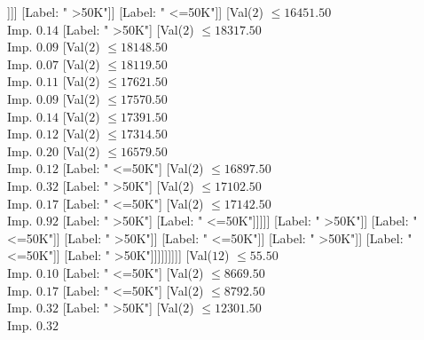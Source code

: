 \documentclass[margin=10pt]{standalone}
\begin{document}
\begin{forest}
																							[Label: " <=50K"]
																							[Val($2$) $ \leq 14367.50$ \\ Imp. $0.81$
																								[Label: " >50K"]
																								[Label: " <=50K"]]]]
																					[Label: " >50K"]]
																				[Label: " <=50K"]]
																			[Val($2$) $ \leq 16451.50$ \\ Imp. $0.14$
																				[Label: " >50K"]
																				[Val($2$) $ \leq 18317.50$ \\ Imp. $0.09$
																					[Val($2$) $ \leq 18148.50$ \\ Imp. $0.07$
																						[Val($2$) $ \leq 18119.50$ \\ Imp. $0.11$
																							[Val($2$) $ \leq 17621.50$ \\ Imp. $0.09$
																								[Val($2$) $ \leq 17570.50$ \\ Imp. $0.14$
																									[Val($2$) $ \leq 17391.50$ \\ Imp. $0.12$
																										[Val($2$) $ \leq 17314.50$ \\ Imp. $0.20$
																											[Val($2$) $ \leq 16579.50$ \\ Imp. $0.12$
																												[Label: " <=50K"]
																												[Val($2$) $ \leq 16897.50$ \\ Imp. $0.32$
																													[Label: " >50K"]
																													[Val($2$) $ \leq 17102.50$ \\ Imp. $0.17$
																														[Label: " <=50K"]
																														[Val($2$) $ \leq 17142.50$ \\ Imp. $0.92$
																															[Label: " >50K"]
																															[Label: " <=50K"]]]]]
																											[Label: " >50K"]]
																										[Label: " <=50K"]]
																									[Label: " >50K"]]
																								[Label: " <=50K"]]
																							[Label: " >50K"]]
																						[Label: " <=50K"]]
																					[Label: " >50K"]]]]]]]]]
													[Val($12$) $ \leq 55.50$ \\ Imp. $0.10$
														[Label: " <=50K"]
														[Val($2$) $ \leq 8669.50$ \\ Imp. $0.17$
															[Label: " <=50K"]
															[Val($2$) $ \leq 8792.50$ \\ Imp. $0.32$
																[Label: " >50K"]
																[Val($2$) $ \leq 12301.50$ \\ Imp. $0.32$

\end{forest}
\end{document}

